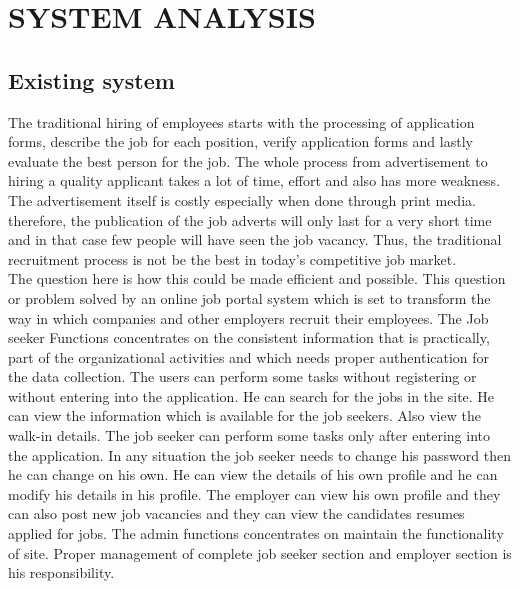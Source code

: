 \documentclass[a4paper,12pt]{report}
\begin{document}
\pagebreak

\chapter{SYSTEM ANALYSIS}
\section{Existing system}

\hspace*{12pt}The traditional hiring of employees starts with the processing of application forms, describe the job for each position, verify application forms and lastly evaluate the best person for the job. The whole process from advertisement to hiring a quality applicant takes a lot of time, effort and also has more weakness. The advertisement itself is costly especially when done through print media. therefore, the publication of the job adverts will only last for a very short time and in that case few people will have seen the job vacancy. Thus, the traditional recruitment process is not be the best in today's competitive job market.\\

The question here is how this could be made efficient and possible. This question or problem solved by an online job portal system which is set to transform the way in which companies and other employers recruit their employees. The Job seeker Functions concentrates on the consistent information that is practically, part of the organizational activities and which needs proper authentication for the data collection. The users can perform some tasks without registering or without entering into the application. He can search for the jobs in the site. He can view the information which is available for the job seekers. Also view the walk-in details. The job seeker can perform some tasks only after entering into the application. In any situation the job seeker needs to change his password then he can change on his own. He can view the details of his own profile and he can modify his details in his profile. The employer can view his own profile and they can also post new job vacancies and they can view the candidates resumes applied for jobs. The admin functions concentrates on maintain the functionality of site. Proper management of complete job seeker section and employer section is his responsibility.\\
\end{document}
